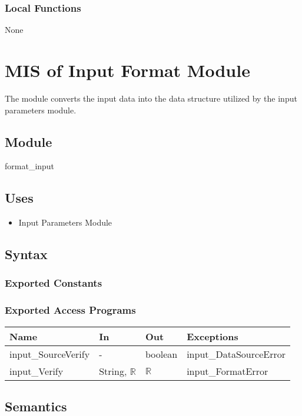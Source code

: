 \documentclass[12pt, titlepage]{article}
\begin{document}
\subsubsection{Local Functions}
None
\newpage
\section{MIS of Input Format Module}
The module converts the input data into the data structure utilized by the input parameters module.

\subsection{Module}
format\_input

\subsection{Uses}
\begin{itemize}
    \item Input Parameters Module
\end{itemize}

\subsection{Syntax}

\subsubsection{Exported Constants}

\subsubsection{Exported Access Programs}

\begin{center}
\begin{tabular}{p{5cm} p{2cm} p{2cm} p{5cm}}
\hline
\textbf{Name} & \textbf{In} & \textbf{Out} & \textbf{Exceptions} \\
\hline
input\_SourceVerify & - & boolean & input\_DataSourceError\\
input\_Verify & String, $\mathbb{R}$ & $\mathbb{R}$ & input\_FormatError\\
\hline
\end{tabular}
\end{center}

\subsection{Semantics}
\end{document}
